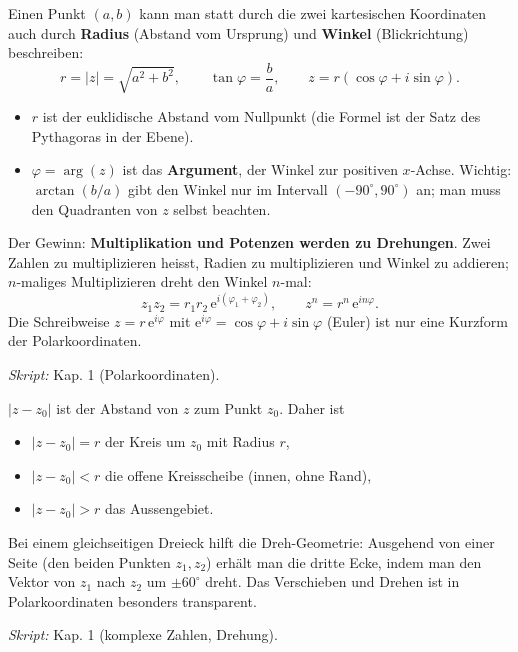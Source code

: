 \begin{werkzeugkasten}
Einen Punkt $(a,b)$ kann man statt durch die zwei kartesischen Koordinaten
auch durch \textbf{Radius} (Abstand vom Ursprung) und \textbf{Winkel}
(Blickrichtung) beschreiben:
\begin{equation*}
  r=|z|=\sqrt{a^2+b^2}, \qquad
  \tan\varphi=\frac{b}{a},\qquad
  z=r(\cos\varphi+i\sin\varphi) .
\end{equation*}
\begin{itemize}
  \item $r$ ist der euklidische Abstand vom Nullpunkt (die Formel ist der
        Satz des Pythagoras in der Ebene).
  \item $\varphi=\arg(z)$ ist das \textbf{Argument}, der Winkel zur
        positiven $x$-Achse. Wichtig: $\arctan(b/a)$ gibt den Winkel nur im
        Intervall $(-90^\circ,90^\circ)$ an; man muss den Quadranten von $z$
        selbst beachten.
\end{itemize}
Der Gewinn: \textbf{Multiplikation und Potenzen werden zu Drehungen}.
Zwei Zahlen zu multiplizieren heisst, Radien zu multiplizieren und Winkel
zu addieren; $n$-maliges Multiplizieren dreht den Winkel $n$-mal:
\begin{equation*}
  z_1z_2=r_1r_2\,\mathrm e^{i(\varphi_1+\varphi_2)},\qquad
  z^n=r^n\,\mathrm e^{in\varphi}.
\end{equation*}
Die Schreibweise $z=r\,\mathrm e^{i\varphi}$ mit
$\mathrm e^{i\varphi}=\cos\varphi+i\sin\varphi$ (Euler) ist nur eine
Kurzform der Polarkoordinaten.

\textit{Skript:} Kap. 1 (Polarkoordinaten).
\end{werkzeugkasten}

\begin{werkzeugkasten}
$|z-z_0|$ ist der Abstand von $z$ zum Punkt $z_0$. Daher ist
\begin{itemize}
  \item $|z-z_0|=r$ der Kreis um $z_0$ mit Radius $r$,
  \item $|z-z_0|<r$ die offene Kreisscheibe (innen, ohne Rand),
  \item $|z-z_0|>r$ das Aussengebiet.
\end{itemize}
Bei einem gleichseitigen Dreieck hilft die Dreh-Geometrie: Ausgehend von
einer Seite (den beiden Punkten $z_1,z_2$) erhält man die dritte Ecke,
indem man den Vektor von $z_1$ nach $z_2$ um $\pm60^\circ$ dreht. Das
Verschieben und Drehen ist in Polarkoordinaten besonders transparent.

\textit{Skript:} Kap. 1 (komplexe Zahlen, Drehung).
\end{werkzeugkasten}

